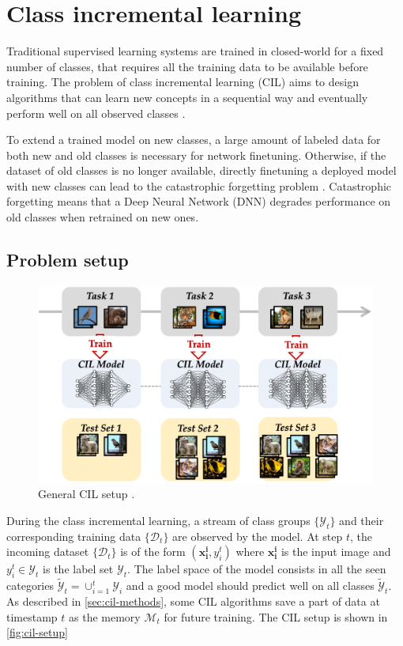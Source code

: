\section{Class incremental learning}
Traditional supervised learning systems are trained in closed-world for a fixed
number of classes, that requires all the training data to be available before training.
The problem of class incremental learning (CIL) aims to design algorithms that can learn new concepts in a sequential way and eventually perform well on all observed classes \cite{yan2021dynamically}.

To extend a trained model on new classes, a large amount of labeled data for both new
and old classes is necessary for network finetuning. Otherwise, if the dataset of old classes is no
longer available, directly finetuning a deployed model with
new classes can lead to the catastrophic forgetting
problem \cite{serra2018overcoming, zhang2021few, mccloskey1989catastrophic}. Catastrophic forgetting means that a Deep Neural Network (DNN) degrades performance on old classes when retrained on new ones.

\subsection{Problem setup}


\begin{figure}
    \begin{center}
        \includegraphics[width=0.9\columnwidth]{images/cil-setup.png}
    \end{center}
    \caption{General CIL setup \cite{zhou2021pycil}.}
    \label{fig:cil-setup}
\end{figure}

During the class incremental learning, a stream of class groups $\{\mathcal{Y}_t\}$ and their corresponding training data $\{\mathcal{D}_t\}$ are observed by the model. At step $t$, the incoming dataset $\{\mathcal{D}_t\}$ is of the form $(\textbf{x}_{\textbf{i}}^{\textbf{i}}, y_i^t)$ where $\textbf{x}_{\textbf{i}}^{\textbf{i}}$ is the input image and $y_i^t \in \mathcal{Y}_t$ is the label set $\mathcal{Y}_t$. The label space of the model consists in all the seen categories $\tilde{\mathcal{Y}}_t = \cup_{i=1}^t \mathcal{Y}_i$ and a good model should predict well on all classes $\tilde{\mathcal{Y}}_t$. As described in \autoref{sec:cil-methods}, some CIL algorithms save a part of data at timestamp $t$ as the memory $\mathcal{M}_t$ for future training. The CIL setup is shown in \autoref{fig:cil-setup}

